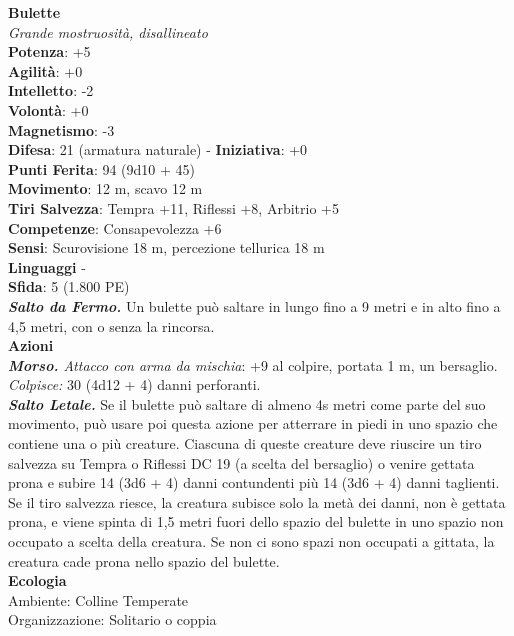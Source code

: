 \begin{multicols}{2}
\medskip\textbf{Bulette}\\
\emph{Grande mostruosità, disallineato}\\
\textbf{Potenza}: +5\\
\textbf{Agilità}: +0\\
\textbf{Intelletto}: -2\\
\textbf{Volontà}: +0\\
\textbf{Magnetismo}: -3\\
\textbf{Difesa}: 21 (armatura naturale) - \textbf{Iniziativa}: +0\\
\textbf{Punti Ferita}: 94 (9d10 + 45)\\
\textbf{Movimento}: 12 m, scavo 12 m\\
\textbf{Tiri Salvezza}: Tempra +11, Riflessi +8, Arbitrio +5\\
\textbf{Competenze}: Consapevolezza +6\\
\textbf{Sensi}: Scurovisione 18 m, percezione tellurica 18 m\\
\textbf{Linguaggi} -\\
\textbf{Sfida}: 5 (1.800 PE)\smallskip\\
\emph{\textbf{Salto da Fermo.}} Un bulette può saltare in lungo fino a 9 metri e in alto fino a 4,5 metri, con o senza la rincorsa.\\
\smallskip\textbf{Azioni}\\
\emph{\textbf{Morso.} Attacco con arma da mischia}: +9 al colpire, portata 1 m, un bersaglio.\\
\emph{Colpisce:} 30 (4d12 + 4) danni perforanti.\\
\emph{\textbf{Salto Letale.}} Se il bulette può saltare di almeno 4s metri come parte del suo movimento, può usare poi questa azione per atterrare in piedi in uno spazio che contiene una o più creature. Ciascuna di queste creature deve riuscire un tiro salvezza su Tempra o Riflessi DC  19 (a scelta del bersaglio) o venire gettata prona e subire 14 (3d6 + 4) danni contundenti più 14 (3d6 + 4) danni taglienti. Se il tiro salvezza riesce, la creatura subisce solo la metà dei danni, non è gettata prona, e viene spinta di 1,5 metri fuori dello spazio del bulette in uno spazio non occupato a scelta della creatura. Se non ci sono spazi non occupati a gittata, la creatura cade prona nello spazio del bulette.\\
\textbf{Ecologia}\\
Ambiente: Colline Temperate\\
Organizzazione: Solitario o coppia\\

\end{multicols}

